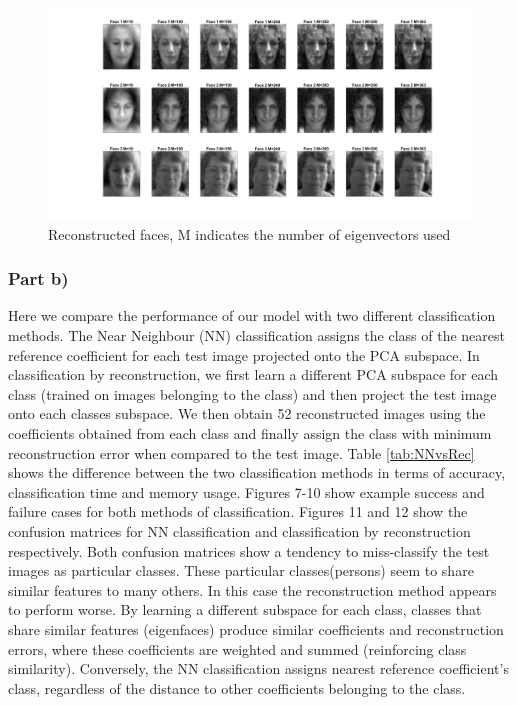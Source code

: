 \documentclass[10pt,technote]{IEEEtran}
\begin{document}
\begin{figure}[htb!]
    \centering
    \includegraphics[width=\linewidth]{../results/ex1aa/face_plots.png}
    \caption{Reconstructed faces, M indicates the number of eigenvectors used}
    \label{fig:reconstr_faces}
\end{figure}


\subsubsection{Part b)}
Here we compare the performance of our model with two different classification methods. The Near Neighbour (NN) classification assigns the class of the nearest reference coefficient for each test image projected onto the PCA subspace. In classification by reconstruction, we first learn a different PCA subspace for each class (trained on images belonging to the class) and then project the test image onto each classes subspace. We then obtain 52 reconstructed images using the coefficients obtained from each class and finally assign the class with minimum reconstruction error when compared to the test image.
Table \ref{tab:NNvsRec} shows the difference between the two classification methods in terms of accuracy, classification time and memory usage.
Figures 7-10 show example success and failure cases for both methods of classification. Figures 11 and 12 show the confusion matrices for NN classification and classification by reconstruction respectively.
Both confusion matrices show a tendency to miss-classify the test images as particular classes. These particular classes(persons) seem to share similar features to many others. In this case the reconstruction method appears to perform worse. By learning a different subspace for each class, classes that share similar features (eigenfaces) produce similar coefficients and reconstruction errors, where these coefficients are weighted and summed (reinforcing class similarity). Conversely, the NN classification assigns nearest reference coefficient's class, regardless of the distance to other coefficients belonging to the class.
\end{document}
